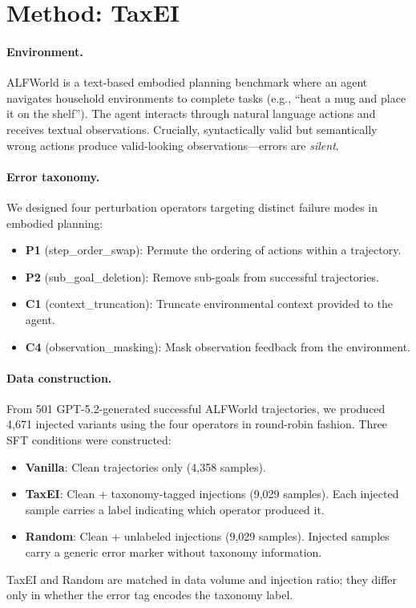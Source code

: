 \documentclass[11pt,a4paper]{article}
\begin{document}
\section{Method: TaxEI}\label{sec:method}

\paragraph{Environment.}
ALFWorld is a text-based embodied planning benchmark where an agent navigates household environments to complete tasks (e.g., ``heat a mug and place it on the shelf'').
The agent interacts through natural language actions and receives textual observations.
Crucially, syntactically valid but semantically wrong actions produce valid-looking observations---errors are \emph{silent}.

\paragraph{Error taxonomy.}
We designed four perturbation operators targeting distinct failure modes in embodied planning:
\begin{itemize}
\item \textbf{P1} (step\_order\_swap): Permute the ordering of actions within a trajectory.
\item \textbf{P2} (sub\_goal\_deletion): Remove sub-goals from successful trajectories.
\item \textbf{C1} (context\_truncation): Truncate environmental context provided to the agent.
\item \textbf{C4} (observation\_masking): Mask observation feedback from the environment.
\end{itemize}

\paragraph{Data construction.}
From 501 GPT-5.2-generated successful ALFWorld trajectories, we produced 4,671 injected variants using the four operators in round-robin fashion.
Three SFT conditions were constructed:
\begin{itemize}
\item \textbf{Vanilla}: Clean trajectories only (4,358 samples).
\item \textbf{TaxEI}: Clean + taxonomy-tagged injections (9,029 samples). Each injected sample carries a label indicating which operator produced it.
\item \textbf{Random}: Clean + unlabeled injections (9,029 samples). Injected samples carry a generic error marker without taxonomy information.
\end{itemize}
TaxEI and Random are matched in data volume and injection ratio; they differ only in whether the error tag encodes the taxonomy label.
\end{document}
